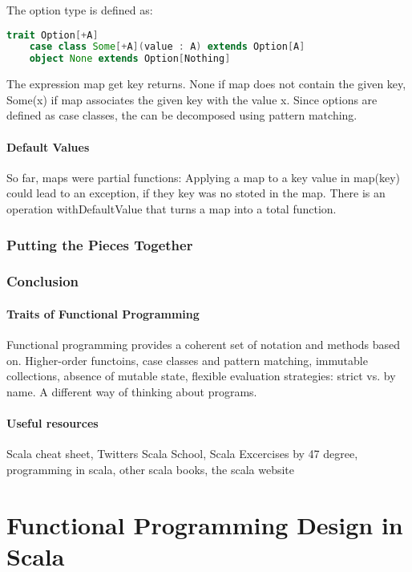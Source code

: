 \documentclass[10pt, a4paper]{report}
\begin{document}
The option type is defined as:

\begin{lstlisting}[language=scala]
	trait Option[+A]
	case class Some[+A](value : A) extends Option[A]
	object None extends Option[Nothing]
\end{lstlisting}

The expression map get key returns. None if map does not contain the given key, Some(x) if map associates the given key with the value x. Since options are defined as case classes, the can be decomposed using pattern matching. 

\subsection{Default Values}

So far, maps were partial functions: Applying a map to a key value in map(key) could lead to an exception, if they key was no stoted in the map. There is an operation withDefaultValue that turns a map into a total function.


\section{Putting the Pieces Together}

\section{Conclusion}

\subsection{Traits of Functional Programming}

Functional programming provides a coherent set of notation and methods based on. Higher-order functoins, case classes and pattern matching, immutable collections, absence of mutable state, flexible evaluation strategies: strict vs. by name. A different way of thinking about programs.

\subsection*{Useful resources}

Scala cheat sheet, Twitters Scala School, Scala Excercises by 47 degree, programming in scala, other scala books, the scala website

\part{Functional Programming Design in Scala}
\end{document}
